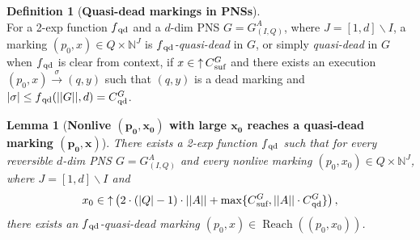 \documentclass[11pt,a4paper]{amsart}
\DeclareMathOperator{\Reach}{Reach}
\newcommand{\step}[1]{\mathrel{\xrightarrow{#1}}}
\newcommand{\nnorm}[1]{||#1||}
\newcommand{\upC}[1]{\mathop{\uparrow}#1}
\newcommand{\suf}{{}_\textnormal{suf}}
\newcommand{\qd}{{}_\textnormal{qd}}
\newcommand{\Nat}{\mathbb{N}}
\newcommand{\setN}{\Nat}
\theoremstyle{plain}
\newtheorem{lem}[thm]{Lemma}
\theoremstyle{definition}
\newtheorem{defi}[thm]{Definition}
\theoremstyle{defC}
\theoremstyle{thmC}
\begin{document}
\begin{defi}[\textbf{Quasi-dead markings in PNSs}]
\hfill\\	
	For a 2-exp function $f\qd$ and a $d$-dim PNS $G=G^A_{(I,Q)}$,
	where $J=[1,d]\smallsetminus I$,
	a marking $(p_0,x)\in Q\times \setN^J$
	is \emph{$f\qd$-quasi-dead} in $G$, or simply
	\emph{quasi-dead} in $G$ when $f\qd$
	is clear from context, if $x\in\upC{C\suf^G}$ 
	and there exists an execution $(p_0,x)\step{\sigma}(q,y)$ such
	that $(q,y)$ is a dead
marking and $|\sigma|\leq
f\qd(\nnorm{G},d)=C\qd^G$.
\end{defi}

\begin{lem}[\textbf{Nonlive $\bm{(p_0,x_0)}$ with large $\bm{x_0}$
	reaches a  quasi-dead
	marking $\bm{(p_0,x)}$}]\label{lem:reachquasiPNS}
	There exists a 2-exp function
	$f\qd$ such that 
	for every reversible $d$-dim PNS $G=G^A_{(I,Q)}$ and 
	every nonlive marking $(p_0,x_0)\in Q\times \setN^J$, where
	$J=[1,d]\smallsetminus I$ and
	\begin{equation}\label{eq:condxzero}
x_0\in\upC{\left(2\cdot(|Q|-1)\cdot\nnorm{A}+
		\max\{C\suf^G,\nnorm{A}\cdot C\qd^G\}\right)},
	\end{equation}
		there exists an $f\qd$-quasi-dead marking
	$(p_0,x)\in\Reach((p_0,x_0))$.
\end{lem}
\end{document}
